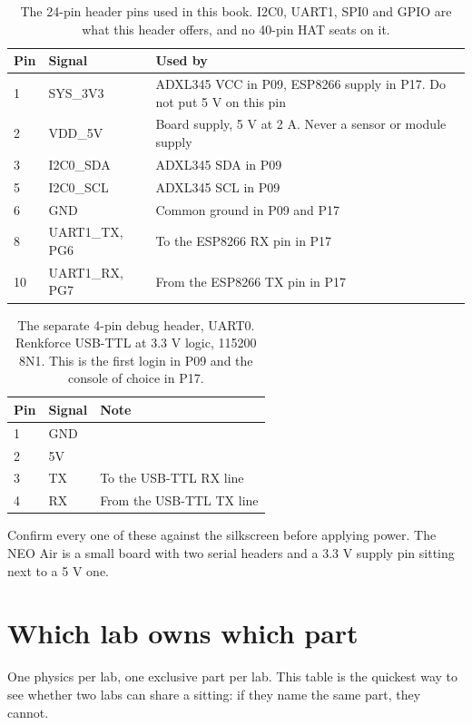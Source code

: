 \begin{table}[H]\centering\small
\begin{tabular}{p{16mm}p{44mm}p{86mm}}
\toprule
Pin & Signal & Used by \\
\midrule
1 & SYS\_3V3 & ADXL345 VCC in P09, ESP8266 supply in P17. Do not put 5 V on this pin \\
2 & VDD\_5V & Board supply, 5 V at 2 A. Never a sensor or module supply \\
3 & I2C0\_SDA & ADXL345 SDA in P09 \\
5 & I2C0\_SCL & ADXL345 SCL in P09 \\
6 & GND & Common ground in P09 and P17 \\
8 & UART1\_TX, PG6 & To the ESP8266 RX pin in P17 \\
10 & UART1\_RX, PG7 & From the ESP8266 TX pin in P17 \\
\bottomrule
\end{tabular}
\caption{The 24-pin header pins used in this book. I2C0, UART1, SPI0 and GPIO are what this header offers, and no 40-pin HAT seats on it.}
\end{table}

\begin{table}[H]\centering\small
\begin{tabular}{p{16mm}p{44mm}p{86mm}}
\toprule
Pin & Signal & Note \\
\midrule
1 & GND & \\
2 & 5V & \\
3 & TX & To the USB-TTL RX line \\
4 & RX & From the USB-TTL TX line \\
\bottomrule
\end{tabular}
\caption{The separate 4-pin debug header, UART0. Renkforce USB-TTL at 3.3 V logic, 115200 8N1. This is the first login in P09 and the console of choice in P17.}
\end{table}

Confirm every one of these against the silkscreen before applying power. The NEO Air is a small board with two serial headers and a 3.3 V supply pin sitting next to a 5 V one.

\section{Which lab owns which part}

One physics per lab, one exclusive part per lab. This table is the quickest way to see whether two labs can share a sitting: if they name the same part, they cannot.

